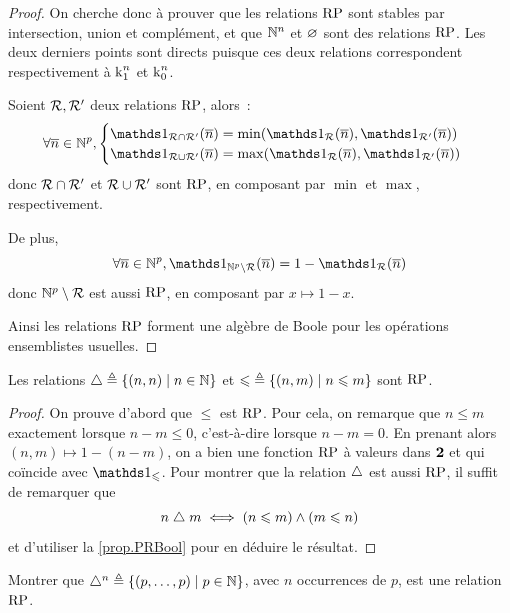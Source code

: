 \begin{proof}
  On cherche donc à prouver que les relations $\operatorname{RP}$ sont stables par
  intersection, union et complément, et que $\mathbb N^n$ et $\varnothing$ sont des
  relations $\operatorname{RP}$. Les deux derniers points sont directs puisque ces deux
  relations correspondent respectivement à $\operatorname{k}_{1}^{n}$ et $\operatorname{k}_{0}^{n}$.

  Soient $\mathrel{\mathcal{R}},\mathrel{\mathcal{R}}'$ deux relations $\operatorname{RP}$, alors~:
  \[\forall \vec n \in \bN^p,
  \begin{cases}
    \indicP{\mathord{\varRR}\cap \mathord{\varRR'}}(\vec n) =
    \min(\indicP{\mathord{\varRR}}(\vec n),\indicP{\mathord{\varRR'}}(\vec n))\\
    \indicP{\mathord{\varRR}\cup \mathord{\varRR'}}(\vec n) =
    \max(\indicP{\mathord{\varRR}}(\vec n),\indicP{\mathord{\varRR'}}(\vec n))
  \end{cases}
  \]
  donc $\mathord{\mathrel{\mathcal{R}}}\cap\mathord{\mathrel{\mathcal{R}}'}$ et
  $\mathord{\mathrel{\mathcal{R}}}\cup\mathord{\mathrel{\mathcal{R}}'}$ sont $\operatorname{RP}$, en composant par $\min$
  et $\max$, respectivement.

  De plus,
  \[\forall \vec n \in \bN^p,
  \indicP{\bN^p\setminus \mathord{\varRR}}(\vec n) =
  1 - \indicP{\mathord{\varRR}}(\vec n)\]
  donc $\mathbb N^p \setminus \mathord{\mathrel{\mathcal{R}}}$ est aussi $\operatorname{RP}$, en composant par
  $x \mapsto 1 - x$.

  Ainsi les relations $\operatorname{RP}$ forment une algèbre de Boole pour les opérations
  ensemblistes usuelles.
\end{proof}

\begin{proposition}\label{fct.RP2}
  Les relations $\mathord{\mathrel{\triangle}} \triangleq \left\{ (n,n) \;\middle\vert\; n \in \mathbb N \right\}$ et
  $\mathord{\leqslant} \triangleq \left\{ (n,m) \;\middle\vert\; n \leqslant m \right\}$ sont $\operatorname{RP}$.
\end{proposition}

\begin{proof}
  On prouve d'abord que $\leq$ est $\operatorname{RP}$. Pour cela, on remarque que
  $n \leq m$
  exactement lorsque $n - m \leq 0$, c'est-à-dire lorsque $n - m = 0$.
  En prenant alors $(n,m) \mapsto 1 - (n - m)$, on a bien une fonction $\operatorname{RP}$ à
  valeurs dans $\bm{2}$ et qui coïncide avec $\indicP{\leq}$. Pour montrer que
  la relation $\mathrel{\triangle}$ est aussi $\operatorname{RP}$, il suffit de remarquer que
  \[n \mathrel{\triangle} m \iff (n \leqslant m) \land (m \leqslant n)\]
  et d'utiliser la \cref{prop.PRBool} pour en déduire le résultat.
\end{proof}

\begin{exercise}
  Montrer que $\mathord{\mathrel{\triangle}^n} \triangleq \left\{ (p,\ldots,p) \;\middle\vert\; p \in \mathbb N \right\}$,
  avec $n$ occurrences de $p$, est une relation $\operatorname{RP}$.
\end{exercise}

